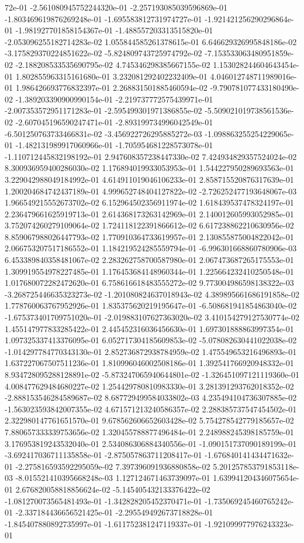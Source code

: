 72e-01	-2.561080945752244320e-01	-2.257193085039596869e-01	-1.803469619876269248e-01	-1.695583812731974727e-01	-1.921421256290296864e-01	-1.981927701858154367e-01	-1.488557203313515820e-01	-2.053096255182714283e-02	1.055844585261378615e-01	6.646629326995848186e-02	-3.175829370224851622e-02	-5.824809743725974792e-02	-7.153533063480951859e-02	-2.188208533535690795e-02	4.745346298385667155e-02	1.153028244604643454e-01	1.802855963315161680e-01	3.232081292402232409e-01	4.046012748711989016e-01	1.986426693776832397e-01	2.268831501885460594e-02	-9.790781077433180490e-02	-1.389203390900990154e-01	-2.219737772575439971e-01	-2.007353572951171283e-01	-2.595499301971386855e-02	-5.509021019738561536e-02	-2.607045196590247471e-01	-2.893199734996042549e-01	-6.501250763733466831e-02	-3.456922726295885272e-03	-1.098863255254229065e-01	-1.482131989917060966e-01	-1.705954681228573078e-01	-1.110712445832198192e-01	2.947608357238447330e-02	7.424934829357524024e-02	8.300936959400286030e-02	1.176894019933053953e-01	1.544227950289693563e-01	3.229042988049184992e-01	4.614911019046106233e-01	2.858715520876317639e-01	1.200204684742437189e-01	4.999652748404127822e-02	-2.726252477193648067e-03	1.966549215552673702e-02	6.152964502356911974e-02	1.618439537478324197e-01	2.236479661625919713e-01	2.614368173263142969e-01	2.140012605993052985e-01	3.752074260279109064e-02	1.724118122391866612e-02	6.617238862210630956e-02	8.859067988026447793e-02	1.770910364733619957e-01	2.130855875004822042e-01	2.066753207517186552e-01	1.184219524285559794e-01	-6.996301668860780906e-03	6.453389840358481067e-02	2.283262758700587980e-01	2.067473687265175553e-01	1.309919554978227485e-01	1.176453684148960344e-01	1.225664232410250548e-01	1.017680072282472620e-01	6.758616618483555272e-02	9.773004986598138322e-03	-3.268725446635323273e-02	-1.201080824637018943e-02	4.389895661686191858e-02	1.778760063767952926e-01	1.835375620219195647e-01	-6.508681941854863040e-02	-1.675373401709751020e-01	-2.019883107627363020e-02	3.410154279127530774e-02	1.455147977833285422e-01	2.445452316036456630e-01	1.697301888863997354e-01	1.097325337413376095e-01	6.052717304185609853e-02	-5.078082630441022038e-02	-1.014297784770343130e-01	2.852736872938784959e-02	1.475549653216496893e-01	1.637227067507511236e-01	1.810996046002508186e-01	1.392541766920948332e-01	8.934728095288128891e-02	-5.873247065940644801e-02	-1.326451097121119360e-01	4.008477629484680227e-02	1.254429780810983330e-01	3.281391293762018352e-02	-2.888153546284589687e-02	8.687729499584033802e-03	4.235494104736307885e-02	-1.563023593842007355e-02	4.671571213240586357e-02	2.288385737547454502e-01	2.322980147761651570e-01	9.678562606652603428e-02	5.754278542779185657e-02	7.880657333339753656e-02	1.320455788877496484e-01	2.248988245398185759e-01	3.176953819243532040e-01	2.534086306884340556e-01	-1.090151737090189199e-01	-3.692417036711135858e-01	-2.875057863711208417e-01	-1.676840141434471632e-01	-2.275816593592295059e-02	7.397396091936880858e-02	5.201257853791853118e-03	-8.015521410395668248e-03	1.127124671463739097e-01	1.639941204346075654e-01	2.676820058818856624e-02	-5.145405432133376422e-02	-1.081270073565481493e-01	-1.342828205452370471e-01	-1.735069245460765242e-01	-2.337184436656521425e-01	-2.295549492673718828e-01	-1.845407880892735997e-01	-1.611752381247119337e-01	-1.921099977976243323e-01	
